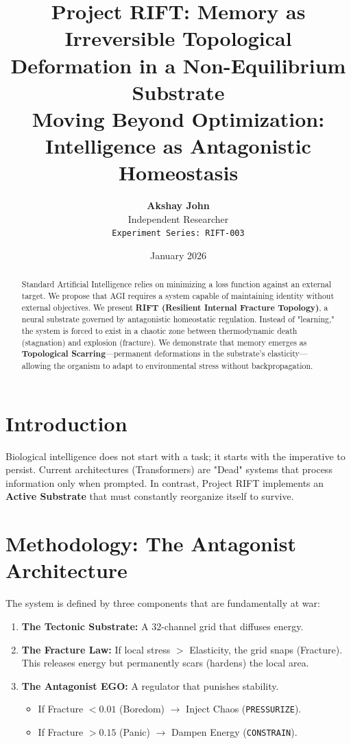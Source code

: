 \documentclass[11pt, a4paper]{article}
\title{\textbf{Project RIFT: Memory as Irreversible Topological Deformation in a Non-Equilibrium Substrate}\\
\large Moving Beyond Optimization: Intelligence as Antagonistic Homeostasis}
\author{\textbf{Akshay John} \\ Independent Researcher \\ \texttt{Experiment Series: RIFT-003}}
\date{January 2026}
\begin{document}
\maketitle

\begin{abstract}
Standard Artificial Intelligence relies on minimizing a loss function against an external target. We propose that AGI requires a system capable of maintaining identity without external objectives. We present \textbf{RIFT (Resilient Internal Fracture Topology)}, a neural substrate governed by antagonistic homeostatic regulation. Instead of "learning," the system is forced to exist in a chaotic zone between thermodynamic death (stagnation) and explosion (fracture). We demonstrate that memory emerges as \textbf{Topological Scarring}—permanent deformations in the substrate's elasticity—allowing the organism to adapt to environmental stress without backpropagation.
\end{abstract}

\section{Introduction}
Biological intelligence does not start with a task; it starts with the imperative to persist. Current architectures (Transformers) are "Dead" systems that process information only when prompted. In contrast, Project RIFT implements an \textbf{Active Substrate} that must constantly reorganize itself to survive.

\section{Methodology: The Antagonist Architecture}
The system is defined by three components that are fundamentally at war:
\begin{enumerate}
    \item \textbf{The Tectonic Substrate:} A 32-channel grid that diffuses energy.
    \item \textbf{The Fracture Law:} If local stress $>$ Elasticity, the grid snaps (Fracture). This releases energy but permanently scars (hardens) the local area.
    \item \textbf{The Antagonist EGO:} A regulator that punishes stability.
    \begin{itemize}
        \item If Fracture $< 0.01$ (Boredom) $\rightarrow$ Inject Chaos (\texttt{PRESSURIZE}).
        \item If Fracture $> 0.15$ (Panic) $\rightarrow$ Dampen Energy (\texttt{CONSTRAIN}).
    \end{itemize}
\end{enumerate}
\end{document}
